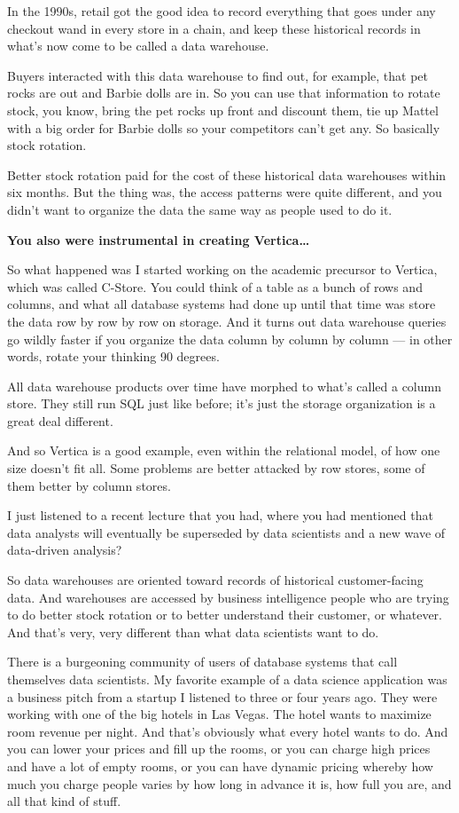 \documentclass[a4paper,12pt,notitlepage,twoside,openright]{article}
\begin{document}
In the 1990s, retail got the good idea to record everything that goes
under any checkout wand in every store in a chain, and keep these
historical records in what's now come to be called a data warehouse.

Buyers interacted with this data warehouse to find out, for example,
that pet rocks are out and Barbie dolls are in. So you can use that
information to rotate stock, you know, bring the pet rocks up front and
discount them, tie up Mattel with a big order for Barbie dolls so your
competitors can't get any. So basically stock rotation.

Better stock rotation paid for the cost of these historical data
warehouses within six months. But the thing was, the access patterns
were quite different, and you didn't want to organize the data the same
way as people used to do it.

\textbf{You also were instrumental in creating Vertica\ldots{}}

So what happened was I started working on the academic precursor to
Vertica, which was called C-Store. You could think of a table as a bunch
of rows and columns, and what all database systems had done up until
that time was store the data row by row by row on storage. And it turns
out data warehouse queries go wildly faster if you organize the data
column by column by column --- in other words, rotate your thinking 90
degrees.

All data warehouse products over time have morphed to what's called a
column store. They still run SQL just like before; it's just the storage
organization is a great deal different.

And so Vertica is a good example, even within the relational model, of
how one size doesn't fit all. Some problems are better attacked by row
stores, some of them better by column stores.

I just listened to a recent lecture that you had, where you had
mentioned that data analysts will eventually be superseded by data
scientists and a new wave of data-driven analysis?

So data warehouses are oriented toward records of historical
customer-facing data. And warehouses are accessed by business
intelligence people who are trying to do better stock rotation or to
better understand their customer, or whatever. And that's very, very
different than what data scientists want to do.

There is a burgeoning community of users of database systems that call
themselves data scientists. My favorite example of a data science
application was a business pitch from a startup I listened to three or
four years ago. They were working with one of the big hotels in Las
Vegas. The hotel wants to maximize room revenue per night. And that's
obviously what every hotel wants to do. And you can lower your prices
and fill up the rooms, or you can charge high prices and have a lot of
empty rooms, or you can have dynamic pricing whereby how much you charge
people varies by how long in advance it is, how full you are, and all
that kind of stuff.
\end{document}
